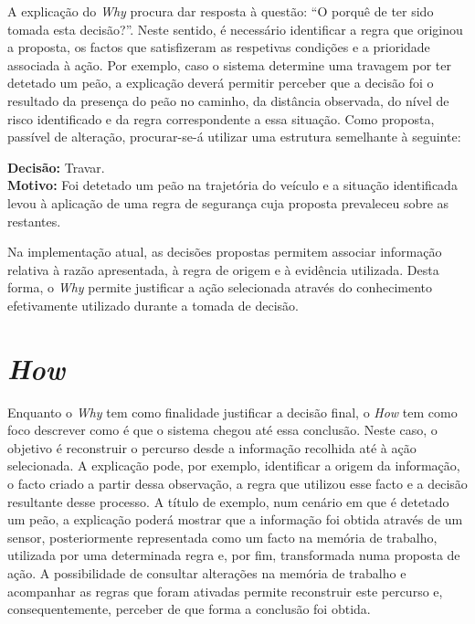 A explicação do \emph{Why} procura dar resposta à questão: \enquote{O porquê de ter
sido tomada esta decisão?}. Neste sentido, é necessário identificar a regra
que originou a proposta, os factos que satisfizeram as respetivas condições e
a prioridade associada à ação. Por exemplo, caso o sistema determine uma
travagem por ter detetado um peão, a explicação deverá permitir perceber que
a decisão foi o resultado da presença do peão no caminho, da distância
observada, do nível de risco identificado e da regra correspondente a essa
situação. Como proposta, passível de alteração, procurar-se-á utilizar uma
estrutura semelhante à seguinte:

\begin{tcolorbox}[enhanced, colback=corFundo, colframe=corEscura,
    boxrule=0pt, leftrule=1.2pt, arc=0pt, outer arc=0pt,
    left=8pt, right=8pt, top=4pt, bottom=4pt, fontupper=\small]
  \textbf{Decisão:} Travar.\\
  \textbf{Motivo:} Foi detetado um peão na trajetória do veículo e a situação
  identificada levou à aplicação de uma regra de segurança cuja proposta
  prevaleceu sobre as restantes.
\end{tcolorbox}

Na implementação atual, as decisões propostas permitem associar informação
relativa à razão apresentada, à regra de origem e à evidência utilizada.
Desta forma, o \emph{Why} permite justificar a ação selecionada através do
conhecimento efetivamente utilizado durante a tomada de decisão.

\section{\emph{How}}
\label{sec:how}

Enquanto o \emph{Why} tem como finalidade justificar a decisão final, o
\emph{How} tem como foco descrever como é que o sistema chegou até essa
conclusão. Neste caso, o objetivo é reconstruir o percurso desde a informação
recolhida até à ação selecionada. A explicação pode, por exemplo, identificar
a origem da informação, o facto criado a partir dessa observação, a regra que
utilizou esse facto e a decisão resultante desse processo. A título de
exemplo, num cenário em que é detetado um peão, a explicação poderá mostrar
que a informação foi obtida através de um sensor, posteriormente representada
como um facto na memória de trabalho, utilizada por uma determinada regra e,
por fim, transformada numa proposta de ação. A possibilidade de consultar
alterações na memória de trabalho e acompanhar as regras que foram ativadas
permite reconstruir este percurso e, consequentemente, perceber de que forma
a conclusão foi obtida.

